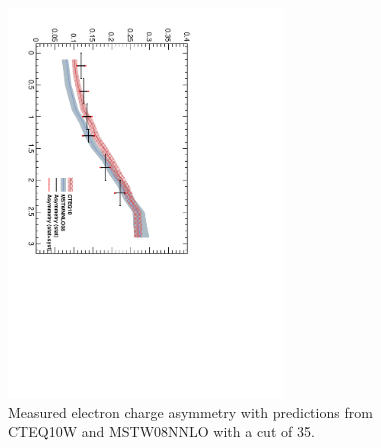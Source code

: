 \begin{figure}[htbp]
  \begin{center}
\includegraphics*[width=0.65\textwidth,angle=90]{Asym_35}
  \caption[Measured electron charge asymmetry with a \pT cut of {\unit{35}{\GeV}}.] 
{\label{fig:asym35} Measured electron charge asymmetry with
predictions from CTEQ10W and MSTW08NNLO with a \pT cut of
\unit{35}{\GeV}\cite{baisini2010electron}.}
  \end{center}
\end{figure}

